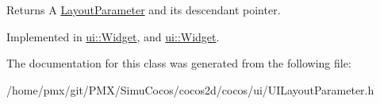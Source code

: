\begin{DoxyReturn}{Returns}
A \hyperlink{classui_1_1LayoutParameter}{Layout\+Parameter} and its descendant pointer. 
\end{DoxyReturn}


Implemented in \hyperlink{classui_1_1Widget_a4d8d234130e8bd8214fa924369b8060f}{ui\+::\+Widget}, and \hyperlink{classui_1_1Widget_a25425cde194b4f37f56f938bb69a9a96}{ui\+::\+Widget}.



The documentation for this class was generated from the following file\+:\begin{DoxyCompactItemize}
\item 
/home/pmx/git/\+P\+M\+X/\+Simu\+Cocos/cocos2d/cocos/ui/U\+I\+Layout\+Parameter.\+h\end{DoxyCompactItemize}

